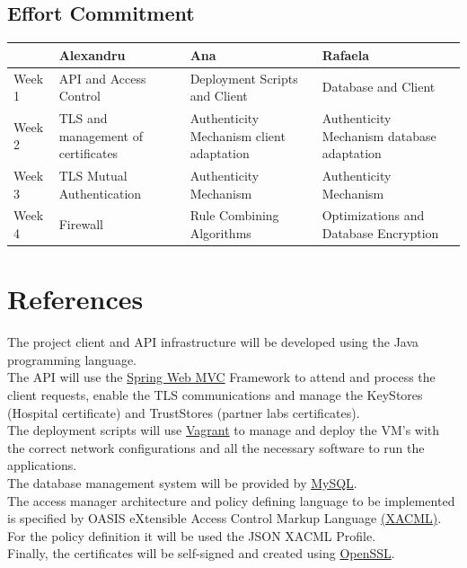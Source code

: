 \subsection{Effort Commitment}

\begin{tabularx}{0.8\textwidth} { 
  | >{\centering\arraybackslash}X 
  | >{\centering\arraybackslash}X 
  | >{\centering\arraybackslash}X 
  | >{\centering\arraybackslash}X | }
 \hline
  & Alexandru & Ana  & Rafaela \\
 \hline
 Week 1  & API and Access Control  & Deployment Scripts and Client  & Database and Client \\
  \hline
  Week 2  & TLS and management of certificates  & Authenticity Mechanism client adaptation  & Authenticity Mechanism database adaptation \\
   \hline
   Week 3  & TLS Mutual Authentication  & Authenticity Mechanism  & Authenticity Mechanism \\
    \hline
    Week 4  & Firewall  & Rule Combining Algorithms  & Optimizations and Database Encryption \\
\hline
\end{tabularx}

\section{References}

The project client and API infrastructure will be developed using the Java programming language. \\

The API will use the \href{https://docs.spring.io/spring-framework/docs/3.2.x/spring-framework-reference/html/mvc.html}{Spring Web MVC} Framework to attend and process the client requests, enable the TLS communications and manage the KeyStores (Hospital certificate) and TrustStores (partner labs certificates). \\

The deployment scripts will use \href{https://www.vagrantup.com/}{Vagrant} to manage and deploy the VM's with the correct network configurations and all the necessary software to run the applications. \\

The database management system will be provided by \href{https://www.mysql.com/}{MySQL}. \\

The access manager architecture and policy defining language to be implemented is specified by OASIS eXtensible Access Control Markup Language \href{https://www.oasis-open.org/committees/tc_home.php?wg_abbrev=xacml#other}{(XACML)}. For the policy definition it will be used the JSON XACML Profile. \\

Finally, the certificates will be self-signed and created using \href{https://www.openssl.org/}{OpenSSL}. \\
